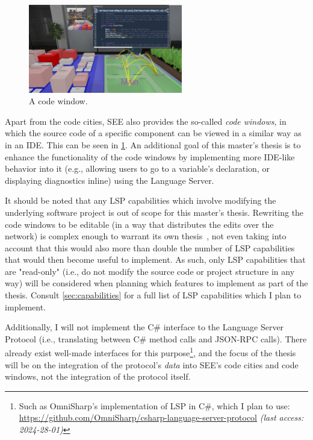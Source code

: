 \documentclass{scrartcl}
\newcommand{\SEE}{\textsc{SEE}}
\newcommand{\web}[2]{\url{#1} \textit{(last access: #2)}}
\begin{document}
{\begin{figure}
	\centering
	\includegraphics[width=0.6\textwidth,trim={30.5cm 22cm 6cm 0},clip]{../figures/SEE_readme}
	\caption{A code window.}\label{fig:window}
\end{figure}

Apart from the code cities, \SEE{} also provides the so-called \emph{code windows}, in which the source code of a specific component can be viewed in a similar way as in an IDE.
This can be seen in \cref{fig:window}.
An additional goal of this master's thesis is to enhance the functionality of the code windows by implementing more IDE-like behavior into it (e.g., allowing users to go to a variable's declaration, or displaying diagnostics inline) using the Language Server.

It should be noted that any LSP capabilities which involve modifying the underlying software project is out of scope for this master's thesis.
Rewriting the code windows to be editable (in a way that distributes the edits over the network) is complex enough to warrant its own thesis~\cite[see also][]{moritz}, not even taking into account that this would also more than double the number of LSP capabilities that would then become useful to implement.
As such, only LSP capabilities that are "read-only" (i.e., do not modify the source code or project structure in any way) will be considered when planning which features to implement as part of the thesis.
Consult \cref{sec:capabilities} for a full list of LSP capabilities which I plan to implement.

Additionally, I will not implement the C\# interface to the Language Server Protocol (i.e., translating between C\# method calls and JSON-RPC calls).
There already exist well-made interfaces for this purpose\footnote{
	Such as OmniSharp's implementation of LSP in C\#, which I plan to use:
	\web{https://github.com/OmniSharp/csharp-language-server-protocol}{2024-28-01}
}, and the focus of the thesis will be on the integration of the protocol's \emph{data} into \SEE{}'s code cities and code windows, not the integration of the protocol itself.

}
\end{document}
